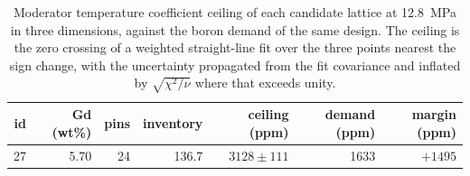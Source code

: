 \begin{table}[htbp]
  \centering
  \caption[Boron ceiling of each candidate lattice]{Moderator temperature coefficient ceiling of each candidate lattice at \SI{12.8}{MPa} in three dimensions, against the boron demand of the same design. The ceiling is the zero crossing of a weighted straight-line fit over the three points nearest the sign change, with the uncertainty propagated from the fit covariance and inflated by $\sqrt{\chi^2/\nu}$ where that exceeds unity.}
  \label{tab:c9-ceilings}
  \begin{tabular}{rrrrrrr}
    \toprule
    id & Gd (wt\%) & pins & inventory & ceiling (ppm) & demand (ppm) & margin (ppm) \\
    \midrule
    27 & 5.70 & 24 & 136.7 & $3128 \pm 111$ & 1633 & $+1495$ \\
    \bottomrule
  \end{tabular}
\end{table}
